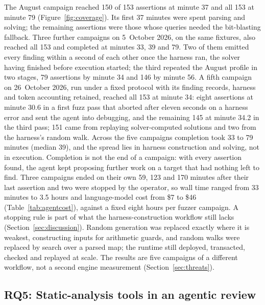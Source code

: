 \documentclass[11pt,a4paper]{article}
\begin{document}
The August campaign reached 150 of 153 assertions at minute 37 and all 153 at minute 79 (Figure~\ref{fig:coverage}). Its first 37 minutes were spent parsing and solving; the remaining assertions were those whose queries needed the bit-blasting fallback. Three further campaigns on 5~October 2026, on the same fixtures, also reached all 153 and completed at minutes 33, 39 and 79. Two of them emitted every finding within a second of each other once the harness ran, the solver having finished before execution started; the third repeated the August profile in two stages, 79 assertions by minute 34 and 146 by minute 56. A fifth campaign on 26~October 2026, run under a fixed protocol with its finding records, harness and token accounting retained, reached all 153 at minute 34: eight assertions at minute 30.6 in a first fuzz pass that aborted after eleven seconds on a harness error and sent the agent into debugging, and the remaining 145 at minute 34.2 in the third pass; 151 came from replaying solver-computed solutions and two from the harness's random walk. Across the five campaigns completion took 33 to 79 minutes (median 39), and the spread lies in harness construction and solving, not in execution. Completion is not the end of a campaign: with every assertion found, the agent kept proposing further work on a target that had nothing left to find. Three campaigns ended on their own 59, 123 and 170 minutes after their last assertion and two were stopped by the operator, so wall time ranged from 33 minutes to 3.5 hours and language-model cost from \$7 to \$46 (Table~\ref{tab:agentcost}), against a fixed eight hours per fuzzer campaign. A stopping rule is part of what the harness-construction workflow still lacks (Section~\ref{sec:discussion}). Random generation was replaced exactly where it is weakest, constructing inputs for arithmetic guards, and random walks were replaced by search over a parsed map; the runtime still deployed, transacted, checked and replayed at scale. The results are five campaigns of a different workflow, not a second engine measurement (Section~\ref{sec:threats}).

\subsection{RQ5: Static-analysis tools in an agentic review}
\label{sec:ablation}
\end{document}
